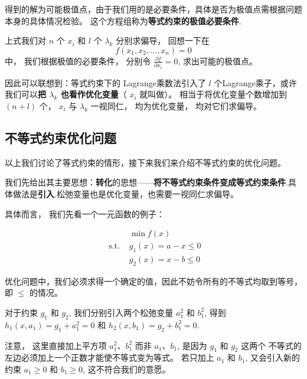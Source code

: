 得到的解为可能极值点，由于我们用的是必要条件，具体是否为极值点需根据问题本身的具体情况检验。 这个方程组称为\textbf{等式约束的极值必要条件}.

上式我们对 $ n $ 个 $ x_{i} $ 和 $ l $ 个 $ \lambda_{k} $ 分别求偏导， 回想一下在 
\begin{equation} f\left(x_{1}, x_{2}, \ldots, x_{n}\right)=0 \end{equation} 
中， 我们根据极值的必要条件， 分别令 $ \frac{\partial f}{\partial x_{i}}=0 $, 求出可能的极值点。 

因此可以联想到：等式约束下的 Lagrange乘数法引入了 $ l $ 个Lagrange乘子，或许我们可以\textbf{把 $ \lambda_{k} $ 也看作优化变量}（ $ x_{i} $ 就叫做）。 相当于将优化变量个数增加到 $ (n+l) $ 个， $ x_{i} $ 与 $ \lambda_{k} $ 一视同仁， 均为优化变量， 均对它们求偏导。

\subsection{不等式约束优化问题}

以上我们讨论了等式约束的情形，接下来我们来介绍不等式约束的优化问题。

我们先给出其主要思想：\textbf{转化}的思想——\textbf{将不等式约束条件变成等式约束条件}.具体做法是\textbf{引入}.松弛变量也是优化变量，也需要一视同仁求偏导。

具体而言， 我们先看一个一元函数的例子：

\begin{example}
    \begin{equation}\begin{aligned}
        &\min f(x)\\
    \text { s.t. }& g_{1}(x)=a-x \leq 0\\
    &g_{2}(x)=x-b \leq 0
    \end{aligned} \end{equation}
\end{example}

\begin{remark}
    优化问题中，我们必须求得一个确定的值，因此不妨令所有的不等式均取到等号，即 $ \leq $ 的情况。
\end{remark}


对于约束 $ g_{1} $ 和 $ g_{2} $, 我们分别引入两个松弛变量 $ a_{1}^{2} $ 和 $ b_{1}^{2} $, 得到 $ h_{1}\left(x, a_{1}\right)=g_{1}+a_{1}^{2}=0 $ 和 $ h_{2}\left(x, b_{1}\right)=g_{2}+b_{1}^{2}=0 $. 

\begin{remark}
    注意， 这里直接加上平方项 $ a_{1}^{2} 、 b_{1}^{2} $ 而非 $ a_{1} 、 b_{1} $, 是因为 $ g_{1} $ 和 $ g_{2} $ 这两个 不等式的左边必须加上一个正数才能使不等式变为等式。 若只加上 $ a_{1} $ 和 $ b_{1} $, 又会引入新的约束 $ a_{1} \geq 0 $ 和 $ b_{1} \geq 0 $, 这不符合我们的意愿。
\end{remark}



